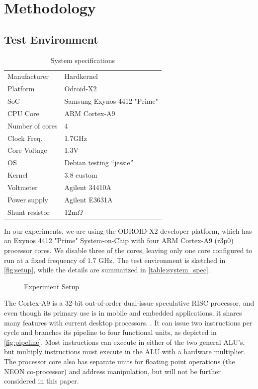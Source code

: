 \section{Methodology}

\subsection{Test Environment}
\begin{table}
    \begin{tabular}{l|l}
        \hline
        \hline
    Manufacturer    & Hardkernel\\
    Platform        & Odroid-X2\\
    SoC             & Samsung Exynos 4412 "Prime"\\
    CPU Core        & ARM Cortex-A9\\
    Number of cores & 4\\
    Clock Freq.     & 1.7GHz\\
    Core Voltage    & 1.3V\\
    OS              & Debian testing ``jessie''\\
    Kernel          & 3.8 custom\\
        \hline
        \hline
    Voltmeter       & Agilent 34410A\\
    Power supply    & Agilent E3631A\\
    Shunt resistor  & 12m$\Omega$\\
        \hline
        \hline
    \end{tabular}
    \caption{System specifications}
    \label{table:system_spec}
\end{table}

In our experiments, we are using the ODROID-X2 \cite{odroid-x2} developer
platform, which has an Exynos 4412 "Prime" System-on-Chip with four ARM
Cortex-A9 (r3p0) processor cores. We disable three of the cores, leaving only
one core configured to run at a fixed frequency of $1.7$ GHz. The test
environment is sketched in \autoref{fig:setup}, while the details are summarized in
\autoref{table:system_spec}.

\begin{figure}
    
    \caption{Experiment Setup}
    \label{fig:setup}
\end{figure}

The Cortex-A9 is a 32-bit out-of-order dual-issue speculative RISC processor,
and even though its primary use is in mobile and embedded applications, it
shares many features with current desktop processors. \cite{patterson}
\cite{hennessy}. It can issue two instructions per cycle and branches its
pipeline to four functional units, as depicted in \autoref{fig:pipeline}. Most
instructions can execute in either of the two general ALU's, but multiply
instructions must execute in the ALU with a hardware multiplier. The processor
core also has separate units for floating point operations (the NEON
co-processor) and address manipulation, but will not be further considered in
this paper.

